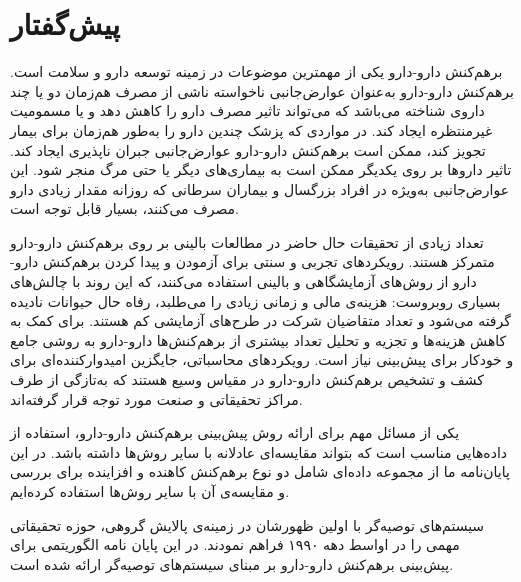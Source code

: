 \chapter*{پیش‌گفتار}

 برهم‌کنش دارو-دارو یکی از مهمترین موضوعات در زمینه توسعه دارو و سلامت است. برهم‌کنش دارو-دارو به‌عنوان عوارض‌جانبی ناخواسته ناشی از مصرف هم‌زمان دو یا چند داروی شناخته می‌باشد که می‌تواند تاثیر مصرف دارو را کاهش دهد و یا مسمومیت غیرمنتظره ایجاد کند. در مواردی كه پزشک چندین دارو را به‌طور هم‌زمان برای بیمار تجویز کند، ممكن است برهم‌کنش دارو-دارو عوارض‌جانبی جبران ناپذیری ایجاد کند. تاثیر داروها بر روی یکدیگر ممکن است به بیماری‌های دیگر یا حتی مرگ منجر شود. این عوارض‌جانبی به‌ویژه در افراد بزرگسال و بیماران سرطانی که روزانه مقدار زیادی دارو مصرف می‌کنند، بسیار قابل توجه است.

تعداد زیادی از تحقیقات حال حاضر در مطالعات بالینی بر روی برهم‌کنش دارو-دارو متمرکز هستند. رویکردهای تجربی و سنتی برای آزمودن و پیدا کردن برهم‌کنش دارو-دارو از روش‌های آزمایشگاهی و بالینی استفاده می‌کنند، که این روند با چالش‌های بسیاری روبروست: هزینه‌ی مالی و زمانی زیادی را می‌طلبد، رفاه حال حیوانات نادیده گرفته ‌می‌شود و تعداد متقاضیان شرکت در طرح‌های آزمایشی کم هستند. برای کمک به کاهش هزینه‌ها و تجزیه و تحلیل تعداد بیشتری از برهم‌کنش‌ها دارو-دارو به روشی جامع و خودکار برای پیش‌بینی نیاز است. رویکردهای محاسباتی، جایگزین امیدوارکنند‌ه‌ای برای کشف و تشخیص برهم‌کنش دارو-دارو در مقیاس وسیع هستند که به‌تازگی از طرف مراکز تحقیقاتی و صنعت مورد توجه قرار گرفته‌اند.

یکی از مسائل مهم برای ارائه روش پیش‌بینی برهم‌کنش‌ دارو-دارو، استفاده از داده‌هایی مناسب است که بتواند مقایسه‌ای عادلانه با سایر روش‌ها داشته باشد.  در این پایان‌نامه ما از مجموعه داده‌ای شامل دو نوع برهم‌کنش کاهنده و افزاینده برای بررسی و مقایسه‌ی آن با سایر روش‌ها استفاده کرده‌ایم.

سیستم‌های توصیه‌گر با اولین ظهورشان در زمینه‌ی پالایش گروهی، حوزه تحقیقاتی مهمی را در اواسط دهه ١٩٩٠ فراهم نمودند. در این پایان نامه  الگوریتمی برای پیش‌بینی برهم‌کنش دارو-دارو بر مبنای سیستم‌های توصیه‌گر ارائه شده است.
 